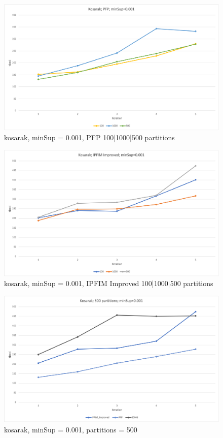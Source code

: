 \begin{figure}
  \centering
  \includegraphics[width=\linewidth]{figures/4iterations/kosarak_pfp_001}
  \caption{kosarak, minSup = 0.001, PFP 100|1000|500 partitions}
  \label{fig:kosarak_pfp_001}
\end{figure}

\begin{figure}
  \centering
  \includegraphics[width=\linewidth]{figures/4iterations/kosarak_ipfim_imp_001}
  \caption{kosarak, minSup = 0.001, IPFIM Improved 100|1000|500 partitions}
  \label{fig:kosarak_ipfim_imp_001}
\end{figure}

\begin{figure}
  \centering
  \includegraphics[width=\linewidth]{figures/4iterations/kosarak_500part_001}
  \caption{kosarak, minSup = 0.001,  partitions = 500}
  \label{fig:kosarak_500part_001}
\end{figure}

